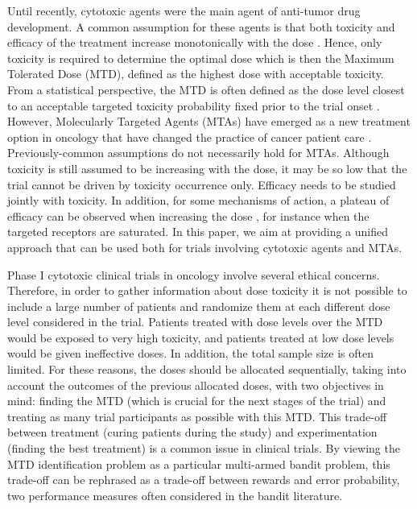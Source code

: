 Until recently, cytotoxic agents were the main agent of anti-tumor drug development. A common assumption for these agents is that both toxicity and efficacy of the treatment increase monotonically with the dose \citep{chevret06}. Hence, only toxicity is required to determine the optimal dose which is then the Maximum Tolerated Dose (MTD), defined as the highest dose with acceptable toxicity. From a statistical perspective, the MTD is often defined as the dose level closest to an acceptable targeted toxicity probability fixed prior to the trial onset \citep{faries94,storer89}. However, Molecularly Targeted Agents (MTAs) have emerged as a new treatment option in oncology that have changed the practice of cancer patient care \citep{Postel-Vinay09,letourneau10,letourneau11,letourneau12}. Previously-common assumptions do not necessarily hold for MTAs. Although toxicity is still assumed to be increasing with the dose, it may be so low that the trial cannot be driven by toxicity occurrence only. Efficacy needs to be studied jointly with toxicity. In addition, for some mechanisms of action, a plateau of efficacy can be observed when increasing the dose \citep{hoering11}, for instance when the targeted receptors are saturated. In this paper, we aim at providing a unified approach that can be used both for trials involving cytotoxic agents and MTAs.

Phase I cytotoxic clinical trials in oncology involve several ethical concerns. Therefore, in order to gather information about dose toxicity it is not possible to include a large number of patients and randomize them at each different dose level considered in the trial. Patients treated with dose levels over the MTD would be exposed to very high toxicity, and patients treated at low dose levels would be given ineffective doses. In addition, the total sample size is often limited. For these reasons, the doses should be allocated sequentially, taking into account the outcomes of the previous allocated doses, with two objectives in mind: finding the MTD (which is crucial for the next stages of the trial) and treating as many trial participants as possible with this MTD. This trade-off between treatment (curing patients during the study) and experimentation (finding the best treatment) is a common issue in clinical trials. By viewing the MTD identification problem as a particular multi-armed bandit problem, this trade-off can be rephrased as a trade-off between rewards and error probability, two performance measures often considered in the bandit literature. %

